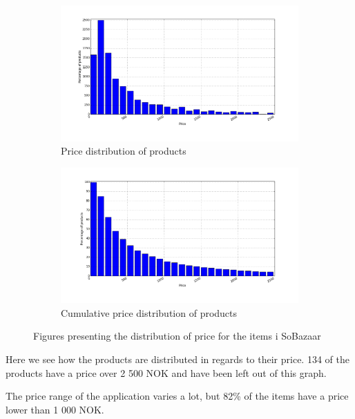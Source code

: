 \begin{figure}[H]
  \centering
  \begin{subfigure}{.5\textwidth}
      \includegraphics[width=\dualGraphWidth]{image/priceDistributiondistribution.png}
      \centering
      \caption{Price distribution of products}
      \label{figure:pricePerProduct}
  \end{subfigure}%
  \begin{subfigure}{.5\textwidth}
      \includegraphics[width=\dualGraphWidth]{image/cumpriceDistributiondistribution.png}
      \centering
      \caption{Cumulative price distribution of products}
      \label{figure:pricePerProductCum}
  \end{subfigure}
  \caption{Figures presenting the distribution of price for the items i SoBazaar}
\end{figure}

        Here we see how the products are distributed in regards to their price.
        134 of the products have a price over 2 500 NOK and have been left out of this graph.

        The price range of the application varies a lot, but 82\% of the items have a price lower than 1 000 NOK.

